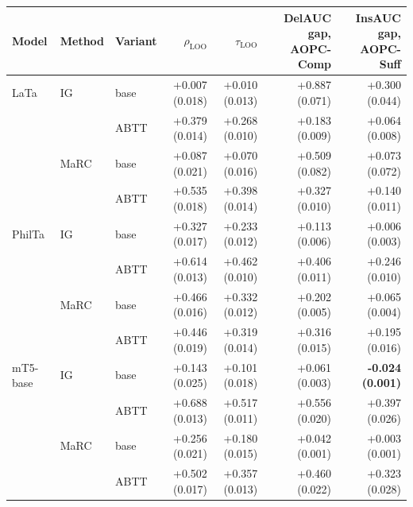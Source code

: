 \begin{table}[t]
\centering
\small
\setlength{\tabcolsep}{4pt}
\begin{tabular}{lllrrrr}
\toprule
Model & Method & Variant & $\rho_{\text{LOO}}$ & $\tau_{\text{LOO}}$ & DelAUC gap, AOPC-Comp & InsAUC gap, AOPC-Suff \\
\midrule
LaTa & IG & base & +0.007 (0.018) & +0.010 (0.013) & +0.887 (0.071) & +0.300 (0.044) \\
 &  & ABTT & +0.379 (0.014) & +0.268 (0.010) & +0.183 (0.009) & +0.064 (0.008) \\
 & MaRC & base & +0.087 (0.021) & +0.070 (0.016) & +0.509 (0.082) & +0.073 (0.072) \\
 &  & ABTT & +0.535 (0.018) & +0.398 (0.014) & +0.327 (0.010) & +0.140 (0.011) \\
\addlinespace[2pt]
PhilTa & IG & base & +0.327 (0.017) & +0.233 (0.012) & +0.113 (0.006) & +0.006 (0.003) \\
 &  & ABTT & +0.614 (0.013) & +0.462 (0.010) & +0.406 (0.011) & +0.246 (0.010) \\
 & MaRC & base & +0.466 (0.016) & +0.332 (0.012) & +0.202 (0.005) & +0.065 (0.004) \\
 &  & ABTT & +0.446 (0.019) & +0.319 (0.014) & +0.316 (0.015) & +0.195 (0.016) \\
\addlinespace[2pt]
mT5-base & IG & base & +0.143 (0.025) & +0.101 (0.018) & +0.061 (0.003) & \textbf{-0.024 (0.001)} \\
 &  & ABTT & +0.688 (0.013) & +0.517 (0.011) & +0.556 (0.020) & +0.397 (0.026) \\
 & MaRC & base & +0.256 (0.021) & +0.180 (0.015) & +0.042 (0.001) & +0.003 (0.001) \\
 &  & ABTT & +0.502 (0.017) & +0.357 (0.013) & +0.460 (0.022) & +0.323 (0.028) \\
\bottomrule
\end{tabular}

\end{table}
